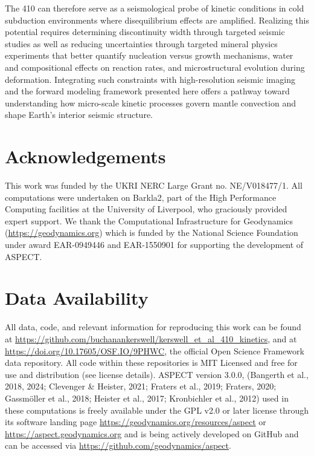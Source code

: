 \documentclass[draft,linenumbers]{agujournal2019}
\begin{document}
The 410 can therefore serve as a seismological probe of kinetic
conditions in cold subduction environments where disequilibrium effects
are amplified. Realizing this potential requires determining
discontinuity width through targeted seismic studies as well as reducing
uncertainties through targeted mineral physics experiments that better
quantify nucleation versus growth mechanisms, water and compositional
effects on reaction rates, and microstructural evolution during
deformation. Integrating such constraints with high-resolution seismic
imaging and the forward modeling framework presented here offers a
pathway toward understanding how micro-scale kinetic processes govern
mantle convection and shape Earth's interior seismic structure.

\section*{Acknowledgements}\label{acknowledgements}

This work was funded by the UKRI NERC Large Grant no. NE/V018477/1. All
computations were undertaken on Barkla2, part of the High Performance
Computing facilities at the University of Liverpool, who graciously
provided expert support. We thank the Computational Infrastructure for
Geodynamics (\url{https://geodynamics.org}) which is funded by the
National Science Foundation under award EAR-0949446 and EAR-1550901 for
supporting the development of ASPECT.

\section*{Data Availability}\label{sec:data-availability}

All data, code, and relevant information for reproducing this work can
be found at
\url{https://github.com/buchanankerswell/kerswell_et_al_410_kinetics},
and at \url{https://doi.org/10.17605/OSF.IO/9PHWC}, the official Open
Science Framework data repository. All code within these repositories is
MIT Licensed and free for use and distribution (see license details).
ASPECT version 3.0.0, (Bangerth et al., 2018, 2024; Clevenger \&
Heister, 2021; {Fraters et al.}, 2019; Fraters, 2020; Gassmöller et al.,
2018; Heister et al., 2017; Kronbichler et al., 2012) used in these
computations is freely available under the GPL v2.0 or later license
through its software landing page
\url{https://geodynamics.org/resources/aspect} or
\url{https://aspect.geodynamics.org} and is being actively developed on
GitHub and can be accessed via
\url{https://github.com/geodynamics/aspect}.
\end{document}
